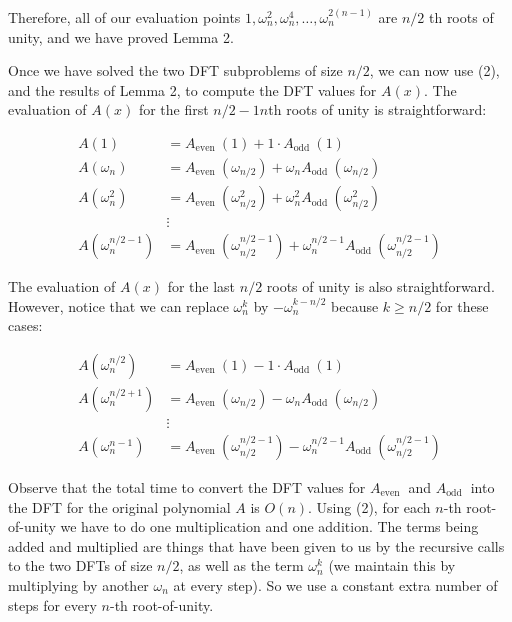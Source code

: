 Therefore, all of our evaluation points $1, \omega_{n}^{2}, \omega_{n}^{4}, \ldots, \omega_{n}^{2(n-1)}$ are $n / 2$ th roots of unity, and we have proved Lemma 2.

Once we have solved the two DFT subproblems of size $n / 2$, we can now use (2), and the results of Lemma 2, to compute the DFT values for $A(x)$. The evaluation of $A(x)$ for the first $n / 2-1 n$th roots of unity is straightforward:

$$
\begin{aligned}
A(1) & =A_{\text {even }}(1)+1 \cdot A_{\text {odd }}(1) \\
A\left(\omega_{n}\right) & =A_{\text {even }}\left(\omega_{n / 2}\right)+\omega_{n} A_{\text {odd }}\left(\omega_{n / 2}\right) \\
A\left(\omega_{n}^{2}\right) & =A_{\text {even }}\left(\omega_{n / 2}^{2}\right)+\omega_{n}^{2} A_{\text {odd }}\left(\omega_{n / 2}^{2}\right) \\
& \vdots \\
A\left(\omega_{n}^{n / 2-1}\right) & =A_{\text {even }}\left(\omega_{n / 2}^{n / 2-1}\right)+\omega_{n}^{n / 2-1} A_{\text {odd }}\left(\omega_{n / 2}^{n / 2-1}\right)
\end{aligned}
$$

The evaluation of $A(x)$ for the last $n / 2$ roots of unity is also straightforward. However, notice that we can replace $\omega_{n}^{k}$ by $-\omega_{n}^{k-n / 2}$ because $k \geq n / 2$ for these cases:

$$
\begin{aligned}
A\left(\omega_{n}^{n / 2}\right) & =A_{\text {even }}(1)-1 \cdot A_{\text {odd }}(1) \\
A\left(\omega_{n}^{n / 2+1}\right) & =A_{\text {even }}\left(\omega_{n / 2}\right)-\omega_{n} A_{\text {odd }}\left(\omega_{n / 2}\right) \\
& \vdots \\
A\left(\omega_{n}^{n-1}\right) & =A_{\text {even }}\left(\omega_{n / 2}^{n / 2-1}\right)-\omega_{n}^{n / 2-1} A_{\text {odd }}\left(\omega_{n / 2}^{n / 2-1}\right)
\end{aligned}
$$

Observe that the total time to convert the DFT values for $A_{\text {even }}$ and $A_{\text {odd }}$ into the DFT for the original polynomial $A$ is $O(n)$. Using (2), for each $n$-th root-of-unity we have to do one multiplication and one addition. The terms being added and multiplied are things that have been given to us by the recursive calls to the two DFTs of size $n / 2$, as well as the term $\omega_{n}^{k}$ (we maintain this by multiplying by another $\omega_{n}$ at every step). So we use a constant extra number of steps for every $n$-th root-of-unity.

